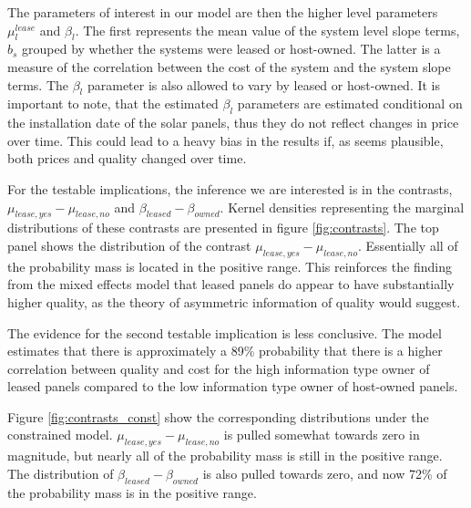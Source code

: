 \documentclass[a4paper]{article}
\begin{document}
The parameters of interest in our model are then the higher level parameters $\mu_l^{lease}$ and $\beta_l$. The first represents the mean value of the system level slope terms, $b_s$ grouped by whether the systems were leased or host-owned. The latter is a measure of the correlation between the cost of the system and the system slope terms. The $\beta_l$ parameter is also allowed to vary by leased or host-owned. It is important to note, that the estimated $\beta_l$ parameters are estimated conditional on the installation date of the solar panels, thus they do not reflect changes in price over time. This could lead to a heavy bias in the results if, as seems plausible, both prices and quality changed over time.

For the testable implications, the inference we are interested is in the contrasts, $\mu_{lease, yes} - \mu_{lease, no}$ and $\beta_{leased}- \beta_{owned}$. Kernel densities representing the marginal distributions of these contrasts are presented in figure \ref{fig:contrasts}. The top panel shows the distribution of the contrast $\mu_{lease, yes} - \mu_{lease, no}$. Essentially all of the probability mass is located in the positive range. This reinforces the finding from the mixed effects model that leased panels do appear to have substantially higher quality, as the theory of asymmetric information of quality would suggest.

The evidence for the second testable implication is less conclusive. The model estimates that there is approximately a 89\% probability that there is a higher correlation between quality and cost for the high information type owner of leased panels compared to the low information type owner of host-owned panels.

Figure \ref{fig:contrasts_const} show the corresponding distributions under the constrained model. $\mu_{lease, yes} - \mu_{lease, no}$ is pulled somewhat towards zero in magnitude, but nearly all of the probability mass is still in the positive range. The distribution of  $\beta_{leased}- \beta_{owned}$ is also pulled towards zero, and now 72\% of the probability mass is in the positive range.
\end{document}
